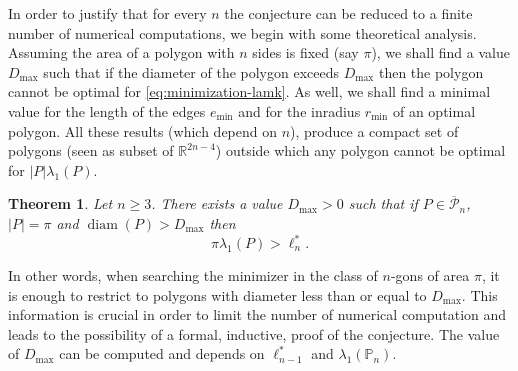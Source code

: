 \documentclass[11pt]{article}
\numberwithin{equation}{section}\newtheorem*{jepEnonce}{\jepEnonceTitle}\newenvironment{enonce*}[1]{\def\jepEnonceTitle{#1}\jepEnonce}{\endjepEnonce}\newtheorem*{conj*}{Conjecture}
\theoremstyle{plain}
\newtheorem{thm}{Theorem}[section]
\theoremstyle{definition}
\newcommand{\diam}{\operatorname{diam}}
\def\R{\mathbb{R}}
\newcommand{\lb}{\lambda}
\newcommand{\ov}{\overline}
\begin{document}
In order to justify that for every $n$ the conjecture can be reduced to a finite number of numerical computations, we begin with some theoretical analysis. Assuming the area of a polygon with $n$ sides is fixed (say $\pi$), we shall find a value $D_{\max}$ such that if the diameter of the polygon exceeds $D_{\max}$ then the polygon cannot be optimal for \eqref{eq:minimization-lamk}. As well, we shall find a minimal value for the length of the edges $e_{\min}$ and for the inradius $r_{\min}$ of an optimal polygon. All these results (which depend on $n$), produce a compact set of polygons (seen as subset of $\R^{2n-4}$) outside which any polygon cannot be optimal for $|P|\lb_1(P)$.

\begin{thm}\label{bobu47}
Let $n\ge 3$. There exists a value $D_{\max} >0$ such that if $P \in \ov {\mathcal P}_n$, $|P|=\pi$ and $\diam (P) > D_{\max}$ then
\[
\pi \lambda_1(P) > \ell_{n}^*.
\]
\end{thm}
In other words, when searching the minimizer in the class of $n$-gons of area $\pi$, it is enough to restrict to polygons with diameter less than or equal to $D_{\max}$. This information is crucial in order to limit the number of numerical computation and leads to the possibility of a formal, inductive, proof of the conjecture. The value of $D_{\max}$ can be computed and depends on $\ell^*_{n-1}$ and $\lb_1(\mathbb P_n)$.
\end{document}
